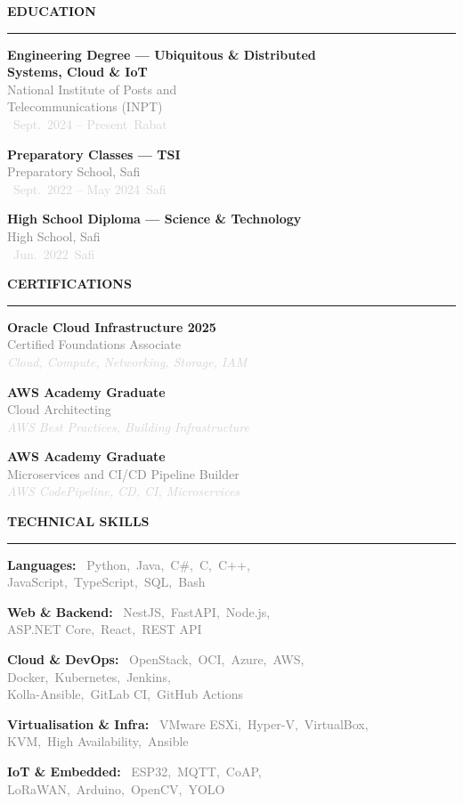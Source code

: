\documentclass[10pt,a4paper]{article}
\newcommand{\cvsection}[1]{%
  \vspace{6pt}%
  {\large\bfseries\color{heading}\MakeUppercase{#1}}\\[-3pt]%
  {\color{rulecolor}\rule{\linewidth}{1.2pt}}%
  \vspace{3pt}\par}
\newcommand{\skillcat}[2]{%
  {\small\textbf{\textcolor{heading}{#1:}}\ %
  {\footnotesize\textcolor{graytext}{#2}}}\par\vspace{2pt}}
\newcommand{\certentry}[3]{%
  {\small\textbf{#1}}\\[-1pt]
  {\footnotesize\textcolor{graytext}{#2}}\\[-1pt]
  {\footnotesize\textcolor{lightgray}{\textit{#3}}}\par\vspace{4pt}}
\newcommand{\eduentry}[4]{%
  {\small\textbf{#1}}\\[-1pt]
  {\footnotesize\textcolor{graytext}{#2}}\\[-1pt]
  {\footnotesize\textcolor{lightgray}{\faCalendar*\ #3\quad\faMapMarker*\ #4}}\par\vspace{4pt}}
\begin{document}
\begin{minipage}[t]{0.39\linewidth}

\cvsection{Education}

\eduentry{Engineering Degree --- Ubiquitous \& Distributed\\Systems, Cloud \& IoT}%
  {National Institute of Posts and\\Telecommunications (INPT)}%
  {Sept.\ 2024 -- Present}{Rabat}

\eduentry{Preparatory Classes --- TSI}%
  {Preparatory School, Safi}%
  {Sept.\ 2022 -- May 2024}{Safi}

\eduentry{High School Diploma --- Science \& Technology}%
  {High School, Safi}%
  {Jun.\ 2022}{Safi}

\cvsection{Certifications}

\certentry{Oracle Cloud Infrastructure 2025}%
  {Certified Foundations Associate}%
  {Cloud, Compute, Networking, Storage, IAM}

\certentry{AWS Academy Graduate}%
  {Cloud Architecting}%
  {AWS Best Practices, Building Infrastructure}

\certentry{AWS Academy Graduate}%
  {Microservices and CI/CD Pipeline Builder}%
  {AWS CodePipeline, CD, CI, Microservices}

\cvsection{Technical Skills}

\skillcat{Languages}{Python,\ Java,\ C\#,\ C,\ C++,\\
  JavaScript,\ TypeScript,\ SQL,\ Bash}

\skillcat{Web \& Backend}{NestJS,\ FastAPI,\ Node.js,\\
  ASP.NET Core,\ React,\ REST API}

\skillcat{Cloud \& DevOps}{OpenStack,\ OCI,\ Azure,\ AWS,\\
  Docker,\ Kubernetes,\ Jenkins,\\
  Kolla-Ansible,\ GitLab CI,\ GitHub Actions}

\skillcat{Virtualisation \& Infra}{%
  VMware ESXi,\ Hyper-V,\ VirtualBox,\\
  KVM,\ High Availability,\ Ansible}

\skillcat{IoT \& Embedded}{ESP32,\ MQTT,\ CoAP,\\
  LoRaWAN,\ Arduino,\ OpenCV,\ YOLO}


\end{minipage}
\end{document}
